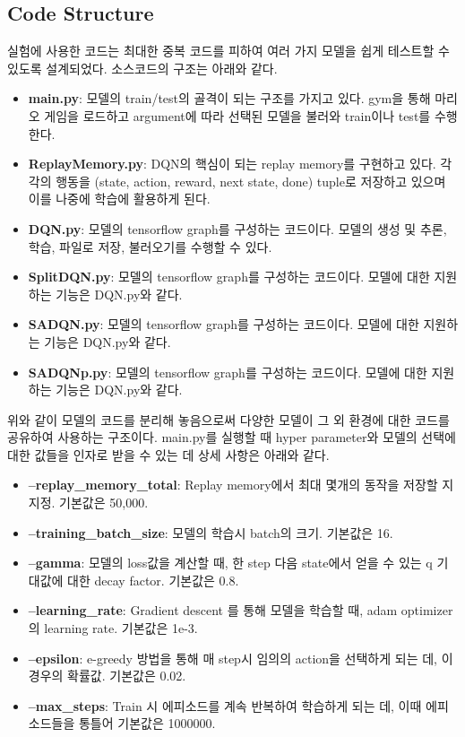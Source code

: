 \subsection{Code Structure}
\label{sec:dev:code}
실험에 사용한 코드는 최대한 중복 코드를 피하여 여러 가지 모델을 쉽게 테스트할 수 있도록 설계되었다.
소스코드의 구조는 아래와 같다.
%
\begin{itemize}
	\item \textbf{main.py}:
		모델의 train/test의 골격이 되는 구조를 가지고 있다. gym을 통해 마리오 게임을 로드하고 argument에 따라 선택된 모델을 불러와 train이나 test를 수행한다.
	\item \textbf{ReplayMemory.py}:
		DQN의 핵심이 되는 replay memory를 구현하고 있다.
		각각의 행동을 (state, action, reward, next state, done) tuple로 저장하고 있으며 이를 나중에 학습에 활용하게 된다.
	\item \textbf{DQN.py}:
		\dqn 모델의 tensorflow graph를 구성하는 코드이다.
		모델의 생성 및 추론, 학습, 파일로 저장, 불러오기를 수행할 수 있다.
	\item \textbf{SplitDQN.py}:
		\sdqn 모델의 tensorflow graph를 구성하는 코드이다.
		모델에 대한 지원하는 기능은 DQN.py와 같다.
	\item \textbf{SADQN.py}:
		\sadqn 모델의 tensorflow graph를 구성하는 코드이다.
		모델에 대한 지원하는 기능은 DQN.py와 같다.
	\item \textbf{SADQNp.py}:
		\sapdqn 모델의 tensorflow graph를 구성하는 코드이다.
		모델에 대한 지원하는 기능은 DQN.py와 같다.
\end{itemize}
%
위와 같이 모델의 코드를 분리해 놓음으로써 다양한 모델이 그 외 환경에 대한 코드를 공유하여 사용하는 구조이다.
main.py를 실행할 때 hyper parameter와 모델의 선택에 대한 값들을 인자로 받을 수 있는 데 상세 사항은 아래와 같다.
%
\begin{itemize}
	\item \textbf{--replay\_memory\_total}:
		Replay memory에서 최대 몇개의 동작을 저장할 지 지정.
		기본값은 50,000.
	\item \textbf{--training\_batch\_size}:
		모델의 학습시 batch의 크기.
		기본값은 16.
	\item \textbf{--gamma}:
		모델의 loss값을 계산할 때, 한 step 다음 state에서 얻을 수 있는 q 기대값에 대한 decay factor.
		기본값은 0.8.
	\item \textbf{--learning\_rate}:
		Gradient descent 를 통해 모델을 학습할 때, adam optimizer의 learning rate.
		기본값은 1e-3.
	\item \textbf{--epsilon}:
		e-greedy 방법을 통해 매 step시 임의의 action을 선택하게 되는 데, 이 경우의 확률값.
		기본값은 0.02.
	\item \textbf{--max\_steps}:
		Train 시 에피소드를 계속 반복하여 학습하게 되는 데, 이때 에피소드들을 통틀어
		기본값은 1000000.
\end{itemize}
%

